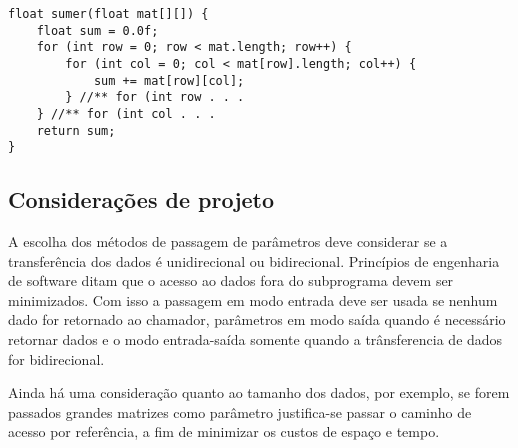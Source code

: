\begin{verbatim}
float sumer(float mat[][]) {
    float sum = 0.0f;
    for (int row = 0; row < mat.length; row++) {
        for (int col = 0; col < mat[row].length; col++) {
            sum += mat[row][col];
        } //** for (int row . . .
    } //** for (int col . . .
    return sum;
}
\end{verbatim}

\subsection{Considerações de projeto} %
\label{sub:consideracoes_de_projeto}
A escolha dos métodos de passagem de parâmetros deve considerar se a transferência dos dados é unidirecional ou bidirecional. Princípios de engenharia de software ditam que o acesso ao dados fora do subprograma devem ser minimizados. Com isso a passagem em modo entrada deve ser usada se nenhum dado for retornado ao chamador, parâmetros em modo saída quando é necessário retornar dados e o modo entrada-saída somente quando a trânsferencia de dados for bidirecional.

Ainda há uma consideração quanto ao tamanho dos dados, por exemplo, se forem passados grandes matrizes como parâmetro justifica-se passar o caminho de acesso por referência, a fim de minimizar os custos de espaço e tempo.




